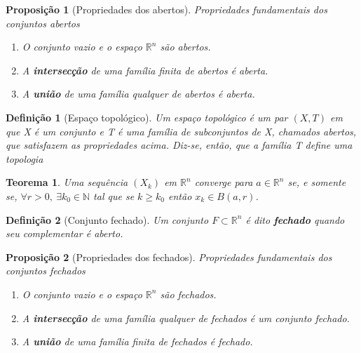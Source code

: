 \documentclass[12pt]{article}
\newtheorem{prop}{Proposição}
\newtheorem{theorem}{Teorema}
\newtheorem{definition}{Definição}
\begin{document}
\begin{prop}[Propriedades dos abertos]
Propriedades fundamentais dos conjuntos abertos

\begin{enumerate}
    \item O conjunto vazio e o espaço $\mathbb{R}^n$ são abertos.
    
    \item A \textbf{intersecção} de uma família finita de abertos é aberta.
    
    \item A \textbf{união} de uma família qualquer de abertos é aberta.
\end{enumerate}
\end{prop}

\begin{definition}[Espaço topológico]
Um espaço topológico é um par $(X, T)$ em que X é um conjunto e T é uma família de subconjuntos de X, chamados abertos, que satisfazem as propriedades acima. Diz-se, então, que a família T define uma topologia
\end{definition}

\begin{theorem}
Uma sequência $(X_k)$ em $\mathbb{R}^n$ converge para $a \in \mathbb{R}^n$ se, e somente se, $\forall r > 0,\ \exists k_0 \in \mathbb{N}$ tal que se $k \geq k_0$ então $x_k \in B(a, r)$.
\end{theorem}

\begin{definition}[Conjunto fechado]
Um conjunto $F \subset \mathbb{R}^n$ é dito \textbf{fechado} quando seu complementar é aberto.
\end{definition}

\begin{prop}[Propriedades dos fechados]
Propriedades fundamentais dos conjuntos fechados

\begin{enumerate}
    \item O conjunto vazio e o espaço $\mathbb{R}^n$ são fechados.
    
    \item A \textbf{intersecção} de uma família qualquer de fechados é um conjunto fechado.
    
    \item A \textbf{união} de uma família finita de fechados é fechado.
\end{enumerate}
\end{prop}
\end{document}

